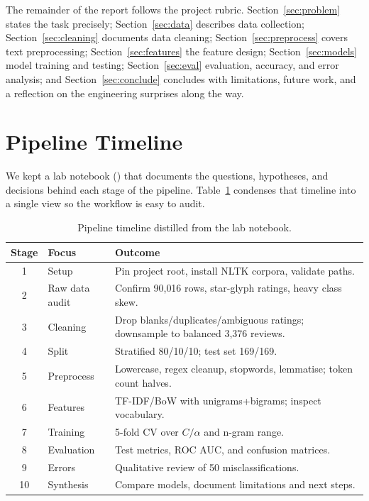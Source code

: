 \documentclass[11pt]{article}
\begin{document}
The remainder of the report follows the project rubric. Section~\ref{sec:problem} states the task precisely; Section~\ref{sec:data} describes data collection; Section~\ref{sec:cleaning} documents data cleaning; Section~\ref{sec:preprocess} covers text preprocessing; Section~\ref{sec:features} the feature design; Section~\ref{sec:models} model training and testing; Section~\ref{sec:eval} evaluation, accuracy, and error analysis; and Section~\ref{sec:conclude} concludes with limitations, future work, and a reflection on the engineering surprises along the way.

\section{Pipeline Timeline}
\label{sec:timeline}

We kept a lab notebook () that documents the questions, hypotheses, and decisions behind each stage of the pipeline. Table~\ref{tab:timeline} condenses that timeline into a single view so the workflow is easy to audit.

\begin{table}[ht]
  \centering
  \footnotesize
  \caption{Pipeline timeline distilled from the lab notebook.}
  \label{tab:timeline}
  \begin{tabularx}{\linewidth}{@{}clX@{}}
    \toprule
    Stage & Focus & Outcome \\
    \midrule
    1 & Setup & Pin project root, install NLTK corpora, validate paths. \\
    2 & Raw data audit & Confirm 90{,}016 rows, star-glyph ratings, heavy class skew. \\
    3 & Cleaning & Drop blanks/duplicates/ambiguous ratings; downsample to balanced 3{,}376 reviews. \\
    4 & Split & Stratified 80/10/10; test set 169/169. \\
    5 & Preprocess & Lowercase, regex cleanup, stopwords, lemmatise; token count halves. \\
    6 & Features & TF-IDF/BoW with unigrams+bigrams; inspect vocabulary. \\
    7 & Training & 5-fold CV over $C/\alpha$ and n-gram range. \\
    8 & Evaluation & Test metrics, ROC AUC, and confusion matrices. \\
    9 & Errors & Qualitative review of 50 misclassifications. \\
    10 & Synthesis & Compare models, document limitations and next steps. \\
    \bottomrule
  \end{tabularx}
\end{table}
\end{document}

